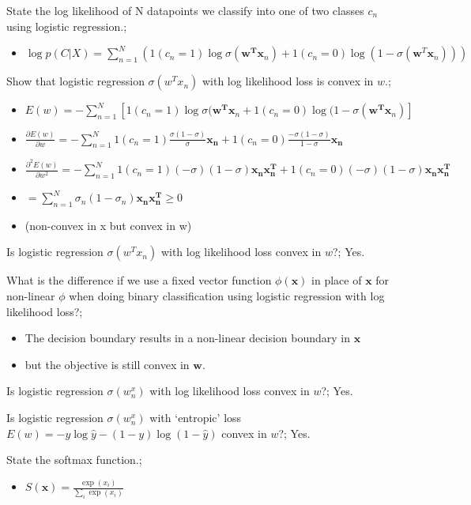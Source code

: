 \documentclass{article}
\begin{document}
State the log likelihood of N datapoints we classify into one of two classes $c_n$ using logistic regression.; \begin{itemize} \item $\log p(C|X) = \sum_{n=1}^N (1(c_n = 1)\log \sigma(\bm{w^Tx}_n) + 1(c_n = 0)\log (1-\sigma(\bm{w}^T\bm{x}_n)))$ \end{itemize}

Show that logistic regression $\sigma(w^Tx_n)$ with log likelihood loss is convex in $w$.; \begin{itemize} \item $E(w)=-\sum_{n=1}^N [1(c_n=1)\log \sigma(\mathbf{w^Tx}_n + 1(c_n=0)\log(1-\sigma(\mathbf{w^Tx}_n)]$ \item $\frac{\partial E(w)}{\partial w} = -\sum_{n=1}^N 1(c_n=1)\frac{\sigma(1-\sigma)}{\sigma}\mathbf{x_n} + 1(c_n=0)\frac{-\sigma(1-\sigma)}{1-\sigma}\mathbf{x_n}$ \item $\frac{\partial^2E(w)}{\partial w^2} = -\sum_{n=1}^N 1(c_n = 1)(-\sigma)(1-\sigma)\mathbf{x_nx_n^T}+1(c_n=0)(-\sigma)(1-\sigma)\mathbf{x_nx_n^T}$ \item $=\sum_{n=1}^N \sigma_n(1-\sigma_n)\mathbf{x_nx_n^T}\geq 0$ \item (non-convex in x but convex in w) \end{itemize}

Is logistic regression $\sigma(w^Tx_n)$ with log likelihood loss convex in $w$?; Yes.

What is the difference if we use a fixed vector function $\phi(\bm{x})$ in place of $\bm{x}$ for non-linear $\phi$ when doing binary classification using logistic regression with log likelihood loss?; \begin{itemize} \item The decision boundary results in a non-linear decision boundary in $\bm{x}$ \item but the objective is still convex in $\bm{w}$. \end{itemize}

Is logistic regression $\sigma(w^x_n)$ with log likelihood loss convex in $w$?; Yes.

Is logistic regression $\sigma(w^x_n)$ with `entropic' loss $E(w) = -y\log\hat{y} - (1-y)\log(1-\hat{y})$ convex in $w$?; Yes.

State the softmax function.; \begin{itemize} \item $S(\bm{x}) = \frac{\exp(x_i)}{\sum_i \exp(x_i)}$ \end{itemize}
\end{document}
